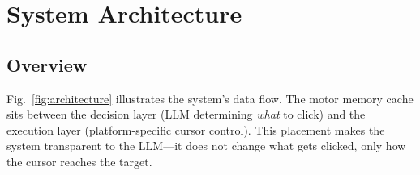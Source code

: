 \documentclass[conference]{IEEEtran}
\begin{document}
\section{System Architecture}

\subsection{Overview}

Fig.~\ref{fig:architecture} illustrates the system's data flow. The motor memory cache sits between the decision layer (LLM determining \emph{what} to click) and the execution layer (platform-specific cursor control). This placement makes the system transparent to the LLM---it does not change what gets clicked, only how the cursor reaches the target.
\end{document}
